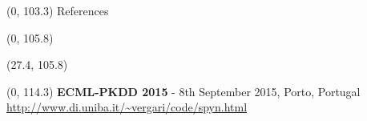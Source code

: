 \documentclass[final]{beamer}
\begin{document}
\begin{frame}{}
  
  
  \begin{textblock}{80}(0, 103.3)
    References
  \end{textblock}
  

  \begin{textblock}{52}(0, 105.8)
    \small
    \setlength\bibitemsep{8pt}
    \printbibliography
  \end{textblock}
  
  \begin{textblock}{25.2}(27.4, 105.8)
    \small
  \end{textblock}
  

  \begin{textblock}{80}(0, 114.3)
    \footnotesize
    \textbf{ECML-PKDD 2015} - 8th September 2015, Porto, Portugal\hfill
    {\url{http://www.di.uniba.it/~vergari/code/spyn.html}}
  \end{textblock}
  
\end{frame}
\end{document}
